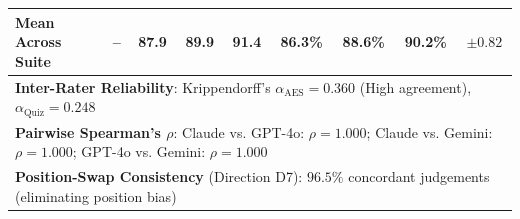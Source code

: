 \begin{table}[t]
\begin{tabular}{lcccccccc}
\midrule
\textbf{Mean Across Suite} & -- & \textbf{87.9} & \textbf{89.9} & \textbf{91.4} & \textbf{86.3\%} & \textbf{88.6\%} & \textbf{90.2\%} & $\pm 0.82$ \\
\midrule
\multicolumn{9}{l}{\textbf{Inter-Rater Reliability}: Krippendorff's $\alpha_{\text{AES}} = 0.360$ (High agreement), $\alpha_{\text{Quiz}} = 0.248$} \\
\multicolumn{9}{l}{\textbf{Pairwise Spearman's $\rho$}: Claude vs. GPT-4o: $\rho = 1.000$; Claude vs. Gemini: $\rho = 1.000$; GPT-4o vs. Gemini: $\rho = 1.000$} \\
\multicolumn{9}{l}{\textbf{Position-Swap Consistency} (Direction D7): $96.5\%$ concordant judgements (eliminating position bias)} \\
\bottomrule
\end{tabular}
\end{table}
